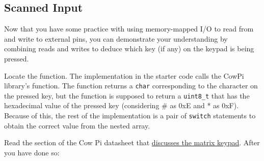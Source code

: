 \subsection{Scanned Input} \label{subsec:ScannedInput}

Now that you have some practice with using memory-mapped I/O to read from and write to external pins, you can demonstrate your understanding by combining reads and writes to deduce which key (if any) on the keypad is being pressed.

Locate the  function.
The implementation in the starter code calls the CowPi library's  function.
The  function returns a \lstinline{char} corresponding to the character on the pressed key,
but the  function is supposed to return a \lstinline{uint8_t} that has the hexadecimal value of the pressed key (considering \# as 0xE and * as 0xF).
Because of this, the rest of the implementation is a pair of \lstinline{switch} statements to obtain the correct value from the  nested array.

Read the section of the Cow Pi datasheet that \href{https://cow-pi.readthedocs.io/en/latest/hardware/inputs.html#matrix-keypad}{discusses the matrix keypad}.
After you have done so:

\begin{description}
        \begin{description}
        \end{description}
\end{description}

